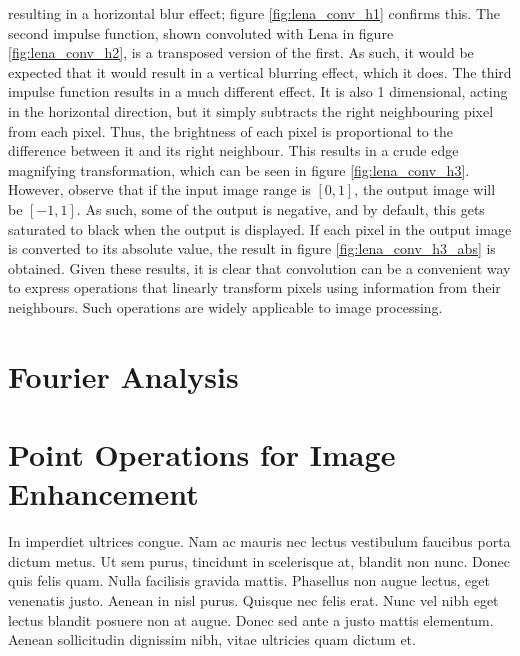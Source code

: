 \documentclass{sydeStyle}
\begin{document}
resulting in a horizontal blur effect; figure \ref{fig:lena_conv_h1} confirms this.
The second impulse function, shown convoluted with Lena in figure
\ref{fig:lena_conv_h2}, is a transposed version of the first.  As such, it would
be expected that it would result in a vertical blurring effect, which it does.
The third impulse function results in a much different effect.
It is also 1 dimensional, acting in the horizontal direction, but it simply
subtracts the right neighbouring pixel from each pixel.
Thus, the brightness of each pixel is proportional to the difference between it
and its right neighbour.
This results in a crude edge magnifying transformation, which can be seen in
figure \ref{fig:lena_conv_h3}.
However, observe that if the input image range is $[0,1]$, the output image will
be $[-1,1]$.
As such, some of the output is negative, and by default, this gets saturated to
black when the output is displayed.
If each pixel in the output image is converted to its absolute value, the result
in figure \ref{fig:lena_conv_h3_abs} is obtained.
Given these results, it is clear that convolution can be a convenient way to
express operations that linearly transform pixels using information from their
neighbours.
Such operations are widely applicable to image processing.

\section*{Fourier Analysis}







\section*{Point Operations for Image Enhancement}
In imperdiet ultrices congue. Nam ac mauris nec lectus vestibulum faucibus
porta dictum metus. Ut sem purus, tincidunt in scelerisque at, blandit non
nunc. Donec quis felis quam. Nulla facilisis gravida mattis. Phasellus non
augue lectus, eget venenatis justo. Aenean in nisl purus. Quisque nec felis
erat. Nunc vel nibh eget lectus blandit posuere non at augue. Donec sed
ante a justo mattis elementum. Aenean sollicitudin dignissim nibh, vitae
ultricies quam dictum et.
\end{document}
